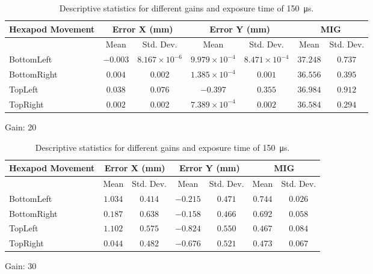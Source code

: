 \begin{table}[h]
    \centering
    \begin{subtable}{\textwidth}
        \centering
        \footnotesize
        \begin{tabular}{lcccccc}
            \toprule
            Hexapod Movement & \multicolumn{2}{c}{Error X (mm)} & \multicolumn{2}{c}{Error Y (mm)} & \multicolumn{2}{c}{MIG}  \\
            \midrule
            & \multicolumn{1}{c}{Mean} & \multicolumn{1}{c}{Std. Dev.} & \multicolumn{1}{c}{Mean} & \multicolumn{1}{c}{Std. Dev.} & \multicolumn{1}{c}{Mean} & \multicolumn{1}{c}{Std. Dev.} \\
            \midrule
            \textsf{BottomLeft} & $-0.003$ & $8.167\times10^{-6}$ & $9.979\times10^{-4}$ & $8.471\times10^{-4}$ & $37.248$ & $0.737$ \\
            \textsf{BottomRight} & $0.004$ & $0.002$ & $1.385\times10^{-4}$ & $0.001$ & $36.556$ & $0.395$ \\
            \textsf{TopLeft} & $0.038$ & $0.076$ & $-0.397$ & $0.355$ & $36.984$ & $0.912$ \\
            \textsf{TopRight} & $0.002$ & $0.002$ & $7.389\times10^{-4}$ & $0.002$ & $36.584$ & $0.294$ \\
            \bottomrule
        \end{tabular}
        \caption{Gain: 20}
    \end{subtable}

    \vspace{10pt}

    \begin{subtable}{\textwidth}
        \centering
        \footnotesize
        \begin{tabular}{lcccccc}
            \toprule
            Hexapod Movement & \multicolumn{2}{c}{Error X (mm)} & \multicolumn{2}{c}{Error Y (mm)} & \multicolumn{2}{c}{MIG}  \\
            \midrule
            & \multicolumn{1}{c}{Mean} & \multicolumn{1}{c}{Std. Dev.} & \multicolumn{1}{c}{Mean} & \multicolumn{1}{c}{Std. Dev.} & \multicolumn{1}{c}{Mean} & \multicolumn{1}{c}{Std. Dev.} \\
            \midrule
            \textsf{BottomLeft} & $1.034$ & $0.414$ & $-0.215$ & $0.471$ & $0.744$ & $0.026$ \\
            \textsf{BottomRight} & $0.187$ & $0.638$ & $-0.158$ & $0.466$ & $0.692$ & $0.058$ \\
            \textsf{TopLeft} & $1.102$ & $0.575$ & $-0.824$ & $0.550$ & $0.467$ & $0.084$ \\
            \textsf{TopRight} & $0.044$ & $0.482$ & $-0.676$ & $0.521$ & $0.473$ & $0.067$ \\
            \bottomrule
        \end{tabular}
        \caption{Gain: 30}
    \end{subtable}

    \caption{Descriptive statistics for different gains and exposure time of \SI{150}{\micro\second}.}
    \label{table:stats_matrix_gain_20}
\end{table}

